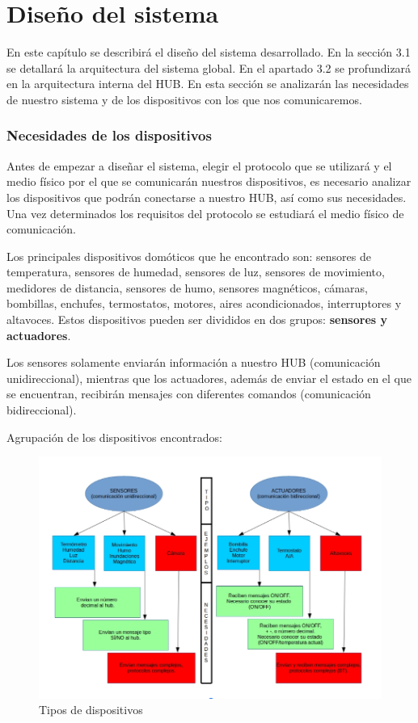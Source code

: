 \chapter{Diseño del sistema}
\label{chap:disenosistema}
En este capítulo se describirá el diseño del sistema desarrollado. 
En la sección 3.1 se detallará la arquitectura del sistema global. 
En el apartado 3.2 se profundizará en la arquitectura interna del HUB.
En esta sección se analizarán las necesidades de nuestro sistema y de los dispositivos con los que nos comunicaremos.
\subsection{Necesidades de los dispositivos}
Antes de empezar a diseñar el sistema, elegir el protocolo que se utilizará y el medio físico por el que se comunicarán 
nuestros dispositivos, es necesario analizar los dispositivos que podrán conectarse a nuestro HUB, así como sus necesidades. 
Una vez determinados los requisitos del protocolo se estudiará el medio físico de comunicación.
\par
Los principales dispositivos domóticos que he encontrado son: sensores de temperatura, sensores de humedad, 
sensores de luz, sensores de movimiento, medidores de distancia, sensores de humo, sensores magnéticos, cámaras, 
bombillas, enchufes, termostatos, motores, aires acondicionados, interruptores y altavoces. Estos dispositivos
 pueden ser divididos en dos grupos: \textbf{sensores y actuadores}. 
\par
Los sensores solamente enviarán información a nuestro HUB (comunicación unidireccional), 
mientras que los actuadores, además de enviar el estado en el que se encuentran, recibirán mensajes con diferentes comandos (comunicación bidireccional).
\par
Agrupación de los dispositivos encontrados:

\begin{figure}[H]
\centering
\includegraphics[width=6.00in]{images/descripcion_dispositivos.png}
\caption{Tipos de dispositivos}
\label{fig:descripcion_dispositivos}
\end{figure}


